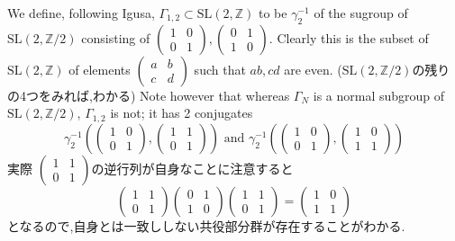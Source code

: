 \documentclass[uplatex,b5j,11pt]{jsbook}
\begin{document}
We define, following Igusa, $\Gamma_{1,2} \subset \mathrm{SL}(2,\mathbb{Z})$
to be $\gamma_2^{-1}$ of the sugroup of $\mathrm{SL}(2, \mathbb{Z}/2)$ consisting of
$\begin{pmatrix}
1 & 0 \\
0 & 1
\end{pmatrix},
\begin{pmatrix}
0 & 1 \\
1 & 0
\end{pmatrix}
$.
Clearly this is the subset of $\mathrm{SL}(2, \mathbb{Z})$ of elements
$
\begin{pmatrix}
a & b \\
c & d
\end{pmatrix}
$ such that $ab, cd$ are even.
($\mathrm{SL}(2, \mathbb{Z}/2)$の残りの4つをみれば,わかる)
Note however that whereas $\Gamma_N$ is a normal subgroup of $\mathrm{SL}(2, \mathbb{Z}/2)$, $\Gamma_{1,2}$ is not; it has 2 conjugates
\begin{equation*}
\gamma_2^{-1} \left( \begin{pmatrix}
1 & 0 \\
0 & 1
\end{pmatrix},
\begin{pmatrix}
1 & 1 \\
0 & 1
\end{pmatrix}
\right)
\mbox{ and }
\gamma_2^{-1} \left( \begin{pmatrix}
1 & 0 \\
0 & 1
\end{pmatrix},
\begin{pmatrix}
1 & 0 \\
1 & 1
\end{pmatrix}
\right)
\end{equation*}
実際
$\begin{pmatrix}
1 & 1 \\
0 & 1
\end{pmatrix}$の逆行列が自身なことに注意すると
\begin{equation*}
\begin{pmatrix}
1 & 1 \\
0 & 1
\end{pmatrix}
\begin{pmatrix}
0 & 1 \\
1 & 0
\end{pmatrix}
\begin{pmatrix}
1 & 1 \\
0 & 1
\end{pmatrix}
=
\begin{pmatrix}
1 & 0 \\
1 & 1
\end{pmatrix}
\end{equation*}
となるので,自身とは一致ししない共役部分群が存在することがわかる.
\end{document}
